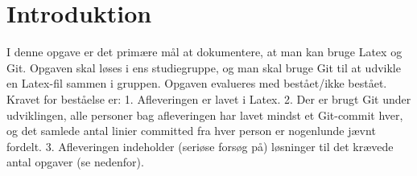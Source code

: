 \section{Introduktion} 

I denne opgave er det primære mål at dokumentere, at man kan bruge Latex
og Git. Opgaven skal løses i ens studiegruppe, og man skal bruge Git til at
udvikle en Latex-fil sammen i gruppen. Opgaven evalueres med bestået/ikke
bestået. Kravet for beståelse er:
1. Afleveringen er lavet i Latex.
2. Der er brugt Git under udviklingen, alle personer bag afleveringen har
lavet mindst et Git-commit hver, og det samlede antal linier committed
fra hver person er nogenlunde jævnt fordelt.
3. Afleveringen indeholder (seriøse forsøg på) løsninger til det krævede
antal opgaver (se nedenfor).